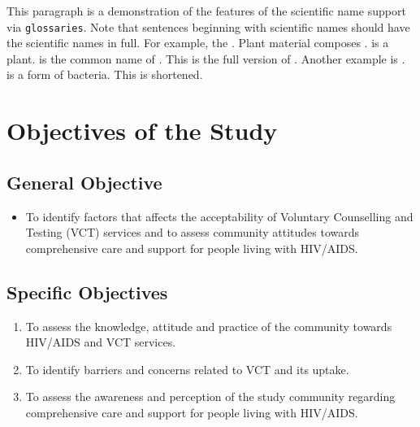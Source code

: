\documentclass{strrespaper-trad}
\begin{document}
			This paragraph is a demonstration of the features of the scientific name support via \texttt{glossaries}.
			Note that sentences beginning with scientific names should have the scientific names in full.
			For example, the \At.
			Plant material composes \At.
			\Atlong is a plant.
			\AtCommon is the common name of \At.
			This is the full version of \Atfirst.
			Another example is \ecoli.
			\ecolilong is a form of bacteria.
			This is \ecoli shortened.

			\Blindtext[2]

		\section{Objectives of the Study}
			\nocite{theopenuniversityHealthManagementEthics2017}
			\subsection{General Objective}
				\begin{itemize}
					\item To identify factors that affects the acceptability of Voluntary Counselling and Testing (VCT) services and to assess community attitudes towards comprehensive care and support for people living with HIV/AIDS.
				\end{itemize}
			\subsection{Specific Objectives}
				\begin{enumerate}
					\item To assess the knowledge, attitude and practice of the community towards HIV/AIDS and VCT services.
					\item To identify barriers and concerns related to VCT and its uptake.
					\item To assess the awareness and perception of the study community regarding comprehensive care and support for people living with HIV/AIDS.
				\end{enumerate}
\end{document}
